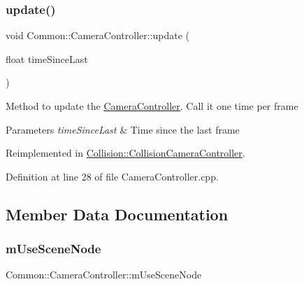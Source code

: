 \mbox{\label{class_common_1_1_camera_controller_a5d11cbced7f78eec997b96bb489d0806}} 
\subsubsection{\texorpdfstring{update()}{update()}}
{\footnotesize\ttfamily void Common\+::\+Camera\+Controller\+::update (\begin{DoxyParamCaption}\item[{float}]{time\+Since\+Last }\end{DoxyParamCaption})\hspace{0.3cm}{\ttfamily [virtual]}}

Method to update the \hyperlink{class_common_1_1_camera_controller}{Camera\+Controller}. Call it one time per frame 
\begin{DoxyParams}{Parameters}
{\em time\+Since\+Last} & Time since the last frame \\
\hline
\end{DoxyParams}


Reimplemented in \hyperlink{class_collision_1_1_collision_camera_controller_ac25037b29b022a2ccf77b16fe0bda670}{Collision\+::\+Collision\+Camera\+Controller}.



Definition at line 28 of file Camera\+Controller.\+cpp.



\subsection{Member Data Documentation}
\mbox{\label{class_common_1_1_camera_controller_a193fd601715f0b7aa3bf772f078200d0}} 
\subsubsection{\texorpdfstring{m\+Use\+Scene\+Node}{mUseSceneNode}}
{\footnotesize\ttfamily Common\+::\+Camera\+Controller\+::m\+Use\+Scene\+Node\hspace{0.3cm}{\ttfamily [protected]}}



